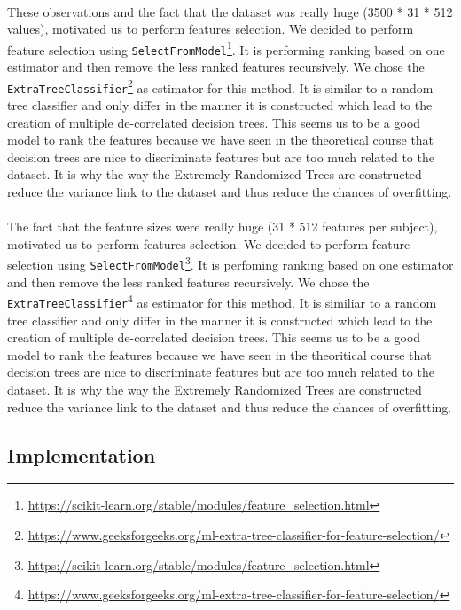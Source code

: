 \documentclass[a4paper, 11pt, oneside]{article}
\begin{document}
\paragraph{}These observations and the fact that the dataset was really huge (3500 * 31 * 512 values), motivated us to perform features selection. We decided to perform feature selection using \texttt{SelectFromModel}\footnote{\url{https://scikit-learn.org/stable/modules/feature_selection.html}}. It is performing ranking based on one estimator and then remove the less ranked features recursively. We chose the \texttt{ExtraTreeClassifier}\footnote{\url{https://www.geeksforgeeks.org/ml-extra-tree-classifier-for-feature-selection/}} as estimator for this method. It is similar to a random tree classifier and only differ in the manner it is constructed which lead to the creation of multiple de-correlated decision trees. This seems us to be a good model to rank the features because we have seen in the theoretical course that decision trees are nice to discriminate features but are too much related to the dataset. It is why the way the Extremely Randomized Trees are constructed reduce the variance link to the dataset and thus reduce the chances of overfitting.
\paragraph{}The fact that the feature sizes were really huge (31 * 512 features per subject), motivated us to perform features selection. We decided to perform feature selection using \texttt{SelectFromModel}\footnote{\url{https://scikit-learn.org/stable/modules/feature_selection.html}}. It is perfoming ranking based on one estimator and then remove the less ranked features recursively. We chose the \texttt{ExtraTreeClassifier}\footnote{\url{https://www.geeksforgeeks.org/ml-extra-tree-classifier-for-feature-selection/}} as estimator for this method. It is similiar to a random tree classifier and only differ in the manner it is constructed which lead to the creation of multiple de-correlated decision trees. This seems us to be a good model to rank the features because we have seen in the theoritical course that decision trees are nice to discriminate features but are too much related to the dataset. It is why the way the Extremely Randomized Trees are constructed reduce the variance link to the dataset and thus reduce the chances of overfitting.

\subsection{Implementation}
\end{document}
